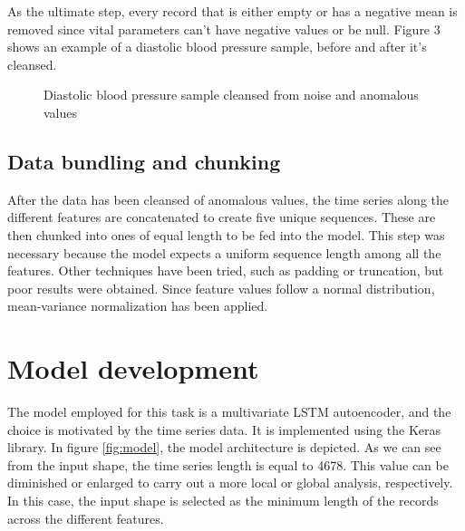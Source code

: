 \documentclass{article}
\begin{document}
\begin{multicols*}{2}
As the ultimate step, every record that is either empty or has a negative mean is removed since vital parameters can't have negative values or be null.
Figure 3 shows an example of a diastolic blood pressure sample, before and after it's cleansed.
\begin{figure}[H]
	\centering
\end{figure}
\begin{figure}[H]
	\label{fig:after}
	\centering
	\caption{Diastolic blood pressure sample cleansed from noise and anomalous values}
\end{figure}


\subsection{Data bundling and chunking}
After the data has been cleansed of anomalous values, the time series along the different features are concatenated to create five unique sequences. These are then chunked into ones of equal length to be fed into the model.
This step was necessary because the model expects a uniform sequence length among all the features. Other techniques have been tried, such as padding or truncation, but poor results were obtained.
Since feature values follow a normal distribution, mean-variance normalization has been applied.


\section{Model development}
\label{model_development}
The model employed for this task is a multivariate LSTM autoencoder, and the choice is motivated by the time series data. It is implemented using the Keras library.
In figure \ref{fig:model}, the model architecture is depicted. As we can see from the input shape, the time series length is equal to 4678. This value can be diminished or enlarged to carry out a more local or global analysis, respectively. In this case, the input shape is selected as the minimum length of the records across the different features.
	



\end{multicols*}
\end{document}
